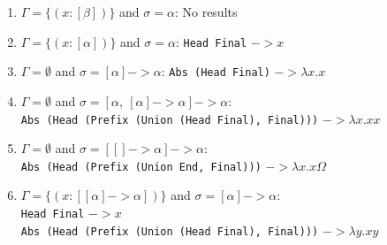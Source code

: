 \documentclass{beamer}
\begin{document}
    \begin{frame}
   
   \begin{enumerate}
       \item $\Gamma = \{(x:[\beta])\}$ and $\sigma = \alpha$: No results
       \item $\Gamma = \{(x:[\alpha])\}$ and $\sigma = \alpha$:
           \qquad\texttt{Head Final} $->x$ 
    
       \item $\Gamma = \emptyset$ and $\sigma = [\alpha] -> \alpha$:
           \qquad \texttt{Abs (Head Final)} $->\lambda x.x$ 
       
              \item $\Gamma = \emptyset$ and $\sigma = [\alpha,\ [\alpha] -> \alpha] -> \alpha$: \\
                   \texttt{Abs (Head (Prefix (Union (Head Final), Final)))}  $->\lambda x.xx$
                  
       \item $\Gamma = \emptyset$ and $\sigma = [[] -> \alpha] -> \alpha$:\\
           \qquad \texttt{Abs (Head (Prefix (Union End, Final)))}  $->\lambda x.x\Omega$
       
       
       
       
       \item $\Gamma = \{(x:[[\alpha] -> \alpha])\}$ and $\sigma = [\alpha] -> \alpha$: \\
           \qquad \texttt{Head Final} $->x$\\
            \texttt{Abs (Head (Prefix (Union (Head Final), Final)))} $->\lambda y.xy$
       
           

\end{enumerate}
\end{frame}
\end{document}
